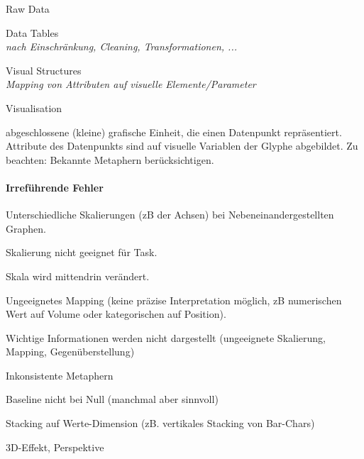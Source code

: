 \documentclass[10pt]{article} %
\begin{document}
\begin{definition} 
\begin{cptenumerate} 
      \item Raw Data
      \item Data Tables \\ \textit{nach Einschränkung, Cleaning, Transformationen, ...}
      \item Visual Structures \\ \textit{Mapping von Attributen auf visuelle Elemente/Parameter}
      \item Visualisation
\end{cptenumerate} 
\end{definition} 

\begin{definition}[Glyph]
  abgeschlossene (kleine) grafische Einheit, die einen Datenpunkt repräsentiert.
  Attribute des Datenpunkts sind auf visuelle Variablen der Glyphe abgebildet.
   Zu beachten:
  Bekannte Metaphern berücksichtigen. 
\end{definition}

\paragraph{Irreführende Fehler}
\begin{cptitemize}
 \item Unterschiedliche Skalierungen (zB der Achsen) bei Nebeneinandergestellten
   Graphen.
 \item Skalierung nicht geeignet für Task.
 \item Skala wird mittendrin verändert.
 \item Ungeeignetes Mapping (keine präzise Interpretation möglich, zB
   numerischen Wert auf Volume oder kategorischen auf Position).
   \item Wichtige Informationen werden nicht dargestellt (ungeeignete
     Skalierung, Mapping, Gegenüberstellung)
 \item Inkonsistente Metaphern
 \item Baseline nicht bei Null (manchmal aber sinnvoll)
 \item Stacking auf Werte-Dimension (zB. vertikales Stacking von Bar-Chars)
 \item 3D-Effekt, Perspektive
\end{cptitemize}
\end{document}
